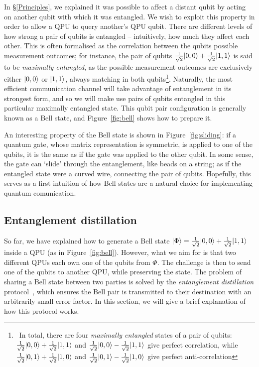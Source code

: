 In \S\ref{Principles}, we explained it was possible to affect a distant qubit by acting on another qubit with which it was entangled. We wish to exploit this property in order to allow a QPU to query another's QPU qubit. There are different levels of how strong a pair of qubits is entangled -- intuitively, how much they affect each other. This is often formalised as the correlation between the qubits possible measurement outcomes; for instance, the pair of qubits \(\frac{1}{\sqrt{2}}\vert 0,0 \rangle + \frac{1}{\sqrt{2}}\vert 1,1 \rangle\) is said to be \textit{maximally entangled}, as the possible measurement outcomes are exclusively either \(\vert 0,0 \rangle\) or \(\vert 1,1 \rangle\), always matching in both qubits\footnote{\, In total, there are four \textit{maximally entangled} states of a pair of qubits: \(\frac{1}{\sqrt{2}}\vert 0,0 \rangle + \frac{1}{\sqrt{2}}\vert 1,1 \rangle\) and \(\frac{1}{\sqrt{2}}\vert 0,0 \rangle - \frac{1}{\sqrt{2}}\vert 1,1 \rangle\) give perfect correlation, while \(\frac{1}{\sqrt{2}}\vert 0,1 \rangle + \frac{1}{\sqrt{2}}\vert 1,0 \rangle\) and \(\frac{1}{\sqrt{2}}\vert 0,1 \rangle - \frac{1}{\sqrt{2}}\vert 1,0 \rangle\) give perfect anti-correlation}. Naturally, the most efficient communication channel will take advantage of entanglement in its strongest form, and so we will make use pairs of qubits entangled in this particular maximally entangled state. This qubit pair configuration is generally known as a Bell state, and Figure~\ref{fig:bell} shows how to prepare it.



An interesting property of the Bell state is shown in Figure~\ref{fig:sliding}: if a quantum gate, whose matrix representation is symmetric, is applied to one of the qubits, it is the same as if the gate was applied to the other qubit. In some sense, the gate can `slide' through the entanglement, like beads on a string; as if the entangled state were a curved wire, connecting the pair of qubits. Hopefully, this serves as a first intuition of how Bell states are a natural choice for implementing quantum comunication.



\subsection{Entanglement distillation}
\label{Distillation}

So far, we have explained how to generate a Bell state \(\vert \Phi \rangle = \frac{1}{\sqrt{2}}\vert 0,0 \rangle + \frac{1}{\sqrt{2}}\vert 1,1 \rangle\) inside a QPU (as in Figure~\ref{fig:bell}). However, what we aim for is that two different QPUs each own one of the qubits from \(\Phi\). The challenge is then to send one of the qubits to another QPU, while preserving the state. The problem of sharing a Bell state between two parties is solved by the \textit{entanglement distillation} protocol~\citep{DistillationProtocol}, which ensures the Bell pair is transmitted to their destination with an arbitrarily small error factor. In this section, we will give a brief explanation of how this protocol works.

